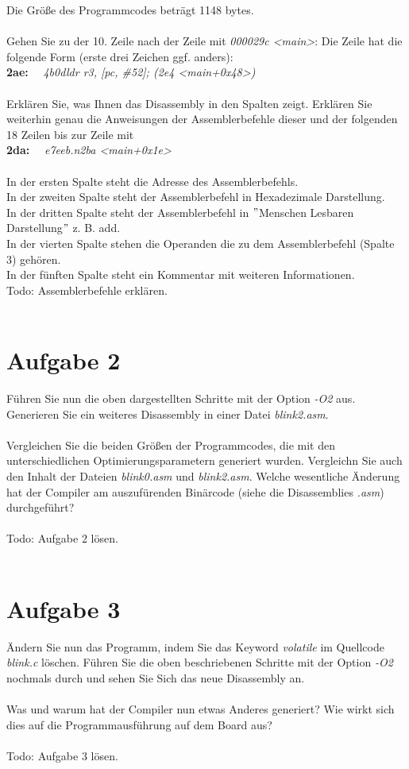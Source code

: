 Die Grö\ss{}e des Programmcodes beträgt 1148 bytes.\\ \\
Gehen Sie zu der 10. Zeile nach der Zeile mit \textit{000029c <main>}: Die Zeile hat die folgende Form (erste drei Zeichen ggf. anders):\\
\textbf{2ae:}~~ \textit{4b0d\quad \quad \quad ldr \quad r3, [pc, \#52]\quad \quad ; (2e4 <main+0x48>)}\\ \\
Erklären Sie, was Ihnen das Disassembly in den Spalten zeigt. Erklären Sie weiterhin genau die Anweisungen der Assemblerbefehle dieser und der folgenden 18 Zeilen bis zur Zeile mit\\
\textbf{2da:}~~ \textit{e7ee\quad \quad \quad b.n\quad 2ba <main+0x1e>\quad \quad }\\ \\
In der ersten Spalte steht die Adresse des Assemblerbefehls.\\
In der zweiten Spalte steht der Assemblerbefehl in Hexadezimale Darstellung.\\
In der dritten Spalte steht der Assemblerbefehl in $"$Menschen Lesbaren Darstellung$"$ z. B. add.\\
In der vierten Spalte stehen die Operanden die zu dem Assemblerbefehl (Spalte 3) gehören.\\
In der fünften Spalte steht ein Kommentar mit weiteren Informationen.\\
Todo: Assemblerbefehle erklären.\\ \\
\section{Aufgabe 2}
Führen Sie nun die oben dargestellten Schritte mit der Option \textit{-O2} aus. Generieren Sie ein weiteres Disassembly in einer Datei \textit{blink2.asm}.\\ \\
Vergleichen Sie die beiden Grö\ss{}en der Programmcodes, die mit den unterschiedlichen Optimierungsparametern generiert wurden. Vergleichn Sie auch den Inhalt der Dateien \textit{blink0.asm} und \textit{blink2.asm}. Welche wesentliche Änderung hat der Compiler am auszufürenden Binärcode (siehe die Disassemblies \textit{.asm}) durchgeführt?\\ \\
Todo: Aufgabe 2 lösen.\\ \\
\section{Aufgabe 3}
Ändern Sie nun das Programm, indem Sie das Keyword \textit{volatile} im Quellcode \textit{blink.c} löschen. Führen Sie die oben beschriebenen Schritte mit der Option \textit{-O2} nochmals durch und sehen Sie Sich das neue Disassembly an.\\ \\
Was und warum hat der Compiler nun etwas Anderes generiert? Wie wirkt sich dies auf die Programmausführung auf dem Board aus?\\ \\
Todo: Aufgabe 3 lösen.\\
